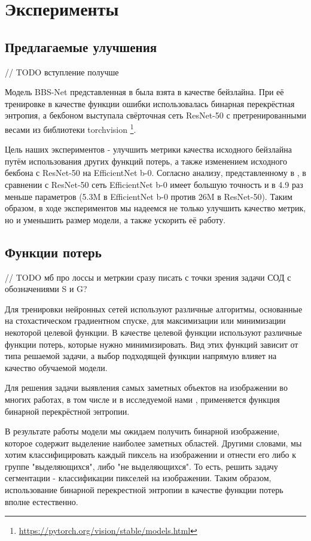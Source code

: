\section{Эксперименты}

\subsection{Предлагаемые улучшения}

// TODO вступление получше 

Модель BBS-Net представленная в \cite{BBS} была взята в качестве бейзлайна. При её тренировке в качестве функции
ошибки использовалась  бинарная перекрёстная энтропия, а бекбоном выступала свёрточная сеть ResNet-50\cite{ResNet}
с претренированными весами из библиотеки torchvision \footnote{\url{https://pytorch.org/vision/stable/models.html}}.

Цель наших экспериментов - улучшить метрики качества исходного бейзлайна путём использования 
других функций потерь, а также изменением исходного бекбона с ResNet-50 на EfficientNet b-0\cite{Efficientnet}.
Согласно анализу, представленному в \cite{Efficientnet}, в сравнении с ResNet-50 сеть EfficientNet b-0 имеет большую точность 
и в 4.9 раз меньше параметров (5.3M в EfficientNet b-0 против 26M в ResNet-50). Таким образом, в ходе экспериментов мы надеемся 
не только улучшить качество метрик, но и уменьшить размер модели, а также ускорить её работу.


\subsection{Функции потерь}


// TODO мб про лоссы и метркии сразу писать с точки зрения задачи СОД с обозначениями S и G?

Для тренировки нейронных сетей используют различные алгоритмы, основанные на стохастическом градиентном спуске,
для максимизации или минимизации некоторой целевой функции. В качестве целевой функции используют различные функции потерь, 
которые нужно минимизировать. Вид этих функций зависит от типа решаемой задачи, а выбор подходящей функции напрямую влияет на 
качество обучаемой модели. 

Для решения задачи выявления самых заметных объектов на изображении 
во многих работах, в том числе и в исследуемой нами \cite{BBS}, применяется функция бинарной перекрёстной энтропии.

В результате работы модели мы ожидаем получить бинарной изображение, которое содержит выделение наиболее заметных областей. 
Другими словами, мы хотим классифицировать каждый пиксель на изображении и отнести его либо к группе "выделяющихся", либо "не выделяющихся". То есть,
решить задачу сегментации - классификации пикселей на изображении. Таким образом, использование бинарной перекрестной энтропии 
в качестве функции потерь вполне естественно.

